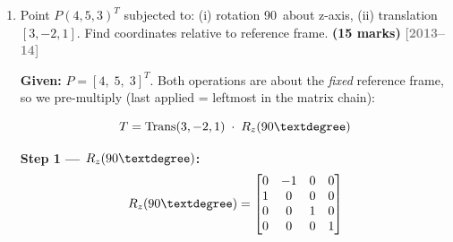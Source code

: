 \documentclass[12pt,a3paper]{article}
\newcommand{\yr}[1]{\hfill\textcolor{gray}{\small\textbf{[#1]}}}
\newcommand{\mk}[1]{\textcolor{orange!70!black}{\small\textbf{(#1 marks)}}}
\begin{document}
\begin{enumerate}
\begin{tcolorbox}[enhanced,breakable,ansbox,colback=cD!4,colframe=cD,
  boxrule=0.8pt,arc=5pt,
  title={\textbf{Answer}},fonttitle=\bfseries\color{white},colbacktitle=cD]
\[
  P' = \begin{bmatrix}
    \frac{1}{\sqrt{2}}(0) + \frac{1}{\sqrt{2}}(9)\\[6pt]
    2\\[6pt]
    -\frac{1}{\sqrt{2}}(0) + \frac{1}{\sqrt{2}}(9)
  \end{bmatrix}
  = \begin{bmatrix}
    \dfrac{9}{\sqrt{2}}\\[8pt]
    2\\[8pt]
    \dfrac{9}{\sqrt{2}}
  \end{bmatrix}
  = \begin{bmatrix}
    \dfrac{9\sqrt{2}}{2}\\[8pt]
    2\\[8pt]
    \dfrac{9\sqrt{2}}{2}
  \end{bmatrix}
\]

\[
  \boxed{P' = \begin{bmatrix}\dfrac{9\sqrt{2}}{2}\\[6pt]2\\[6pt]\dfrac{9\sqrt{2}}{2}\end{bmatrix}
  \approx \begin{bmatrix}6.364\\2\\6.364\end{bmatrix}}
\]

\end{tcolorbox}

\item \label{qlabel:C4-Q2}
Point $P(4,5,3)^T$ subjected to: (i) rotation 90\textdegree\ about
z-axis, (ii) translation $[3,-2,1]$. Find coordinates relative to
reference frame. \mk{15}
\yr{2013--14}

\begin{tcolorbox}[enhanced,breakable,ansbox,colback=cD!4,colframe=cD,
  boxrule=0.8pt,arc=5pt,
  title={\textbf{Answer}},fonttitle=\bfseries\color{white},colbacktitle=cD]

\textbf{Given:} $P = [4,\;5,\;3]^T$. Both operations are about the
\emph{fixed} reference frame, so we pre-multiply (last applied =
leftmost in the matrix chain):

\[
  T = \mathrm{Trans}(3,-2,1)\;\cdot\;R_z(90\textdegree)
\]

\textbf{Step 1 — $R_z(90\textdegree)$:}
\[
  R_z(90\textdegree) =
  \begin{bmatrix}
    0 & -1 & 0 & 0\\
    1 &  0 & 0 & 0\\
    0 &  0 & 1 & 0\\
    0 &  0 & 0 & 1
  \end{bmatrix}
\]


\end{tcolorbox}
\end{enumerate}
\end{document}
